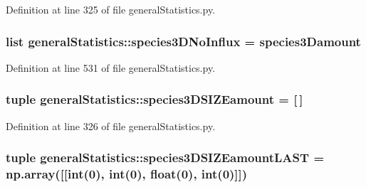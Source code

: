 \-Definition at line 325 of file general\-Statistics.\-py.

\hypertarget{namespacegeneral_statistics_ab0b7c4a5bea76a8e43a176a8438cdb81}{
\subsubsection[{species3\-D\-No\-Influx}]{\setlength{\rightskip}{0pt plus 5cm}list {\bf general\-Statistics\-::species3\-D\-No\-Influx} = {\bf species3\-Damount}}}\label{namespacegeneral_statistics_ab0b7c4a5bea76a8e43a176a8438cdb81}


\-Definition at line 531 of file general\-Statistics.\-py.

\hypertarget{namespacegeneral_statistics_a49505b471d187739723d5212c07a7a0a}{
\subsubsection[{species3\-D\-S\-I\-Z\-Eamount}]{\setlength{\rightskip}{0pt plus 5cm}tuple {\bf general\-Statistics\-::species3\-D\-S\-I\-Z\-Eamount} = \mbox{[}$\,$\mbox{]}}}\label{namespacegeneral_statistics_a49505b471d187739723d5212c07a7a0a}


\-Definition at line 326 of file general\-Statistics.\-py.

\hypertarget{namespacegeneral_statistics_a34b463634037dcf1dff3e5c03eb9d169}{
\subsubsection[{species3\-D\-S\-I\-Z\-Eamount\-L\-A\-S\-T}]{\setlength{\rightskip}{0pt plus 5cm}tuple {\bf general\-Statistics\-::species3\-D\-S\-I\-Z\-Eamount\-L\-A\-S\-T} = np.\-array(\mbox{[}\mbox{[}int(0), int(0), float(0), int(0)\mbox{]}\mbox{]})}}\label{namespacegeneral_statistics_a34b463634037dcf1dff3e5c03eb9d169}


